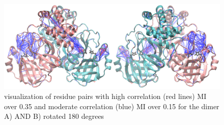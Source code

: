 \documentclass{biophys-new}
\begin{document}
\begin{figure}[hbt!]
\centering
\graphicspath{ {./supplemental_figures/} }
\includegraphics[width=0.6\linewidth]{dimer_MI_image.pdf}
\caption{visualization of residue pairs with high correlation (red lines) MI over 0.35 and moderate correlation (blue) MI over 0.15 for the dimer A) AND B) rotated 180 degrees}
\label{fig:view}
\end{figure}
\end{document}
